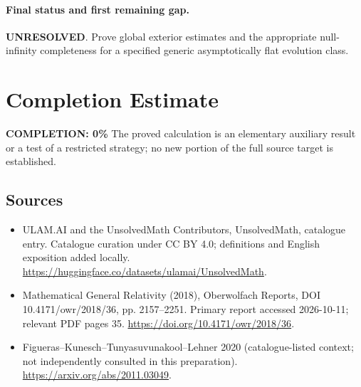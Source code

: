\documentclass[11pt]{article}
\begin{document}
\paragraph{Final status and first remaining gap.}
\textbf{UNRESOLVED}. Prove global exterior estimates and the appropriate null-infinity completeness for a specified generic asymptotically flat evolution class.

\section{Completion Estimate}
\noindent\textbf{COMPLETION: 0\%}
The proved calculation is an elementary auxiliary result or a test of a restricted strategy; no new portion of the full source target is established.

\subsection{Sources}
\begin{itemize}
\item[\hypertarget{source:statement:1}{S1}] ULAM.AI and the UnsolvedMath Contributors, UnsolvedMath, catalogue entry. Catalogue curation under CC BY 4.0; definitions and English exposition added locally.
\url{https://huggingface.co/datasets/ulamai/UnsolvedMath}.
\item[\hypertarget{source:statement:2}{S2}] Mathematical General Relativity (2018), Oberwolfach Reports, DOI 10.4171/owr/2018/36, pp. 2157--2251. Primary report accessed 2026-10-11; relevant PDF pages 35.
\url{https://doi.org/10.4171/owr/2018/36}.
\item[\hypertarget{source:statement:3}{S3}] Figueras--Kunesch--Tunyasuvunakool--Lehner 2020 (catalogue-listed context; not independently consulted in this preparation).
\url{https://arxiv.org/abs/2011.03049}.
\end{itemize}
\label{end:statement}
\end{document}
